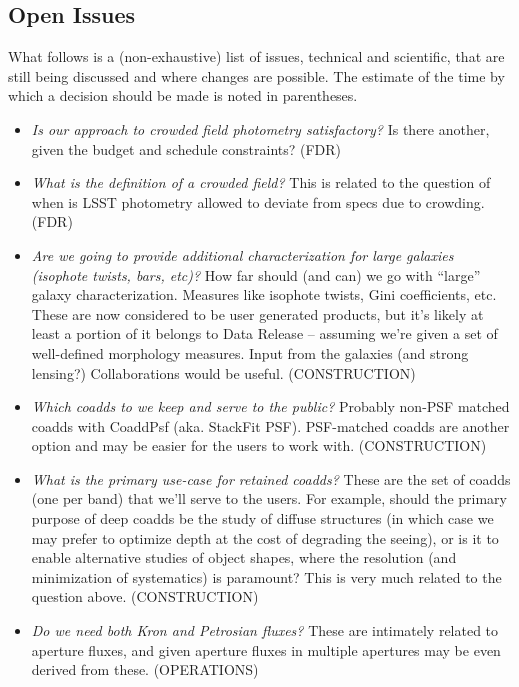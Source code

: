 \begin{openissues}
\subsection{Open Issues}

What follows is a (non-exhaustive) list of issues, technical and scientific, that are still being discussed and where changes are possible. The estimate of the time by which a decision should be made is noted in parentheses.

\begin{itemize}
    \item \emph{Is our approach to crowded field photometry satisfactory?} Is there another, given the budget and schedule constraints? (FDR)

    \item \emph{What is the definition of a crowded field?} This is related to the question of when is LSST photometry allowed to deviate from \SRD specs due to crowding. (FDR)

    \item \emph{Are we going to provide additional characterization for large galaxies (isophote twists, bars, etc)?} How far should (and can) we go with ``large'' galaxy characterization. Measures like isophote twists, Gini coefficients, etc. These are now considered to be  user generated products, but it's likely at least a portion of it belongs to Data Release -- assuming we're given a set of well-defined morphology measures. Input from the galaxies (and strong lensing?) Collaborations would be useful. (CONSTRUCTION)

    \item \emph{Which coadds to we keep and serve to the public?} Probably non-PSF matched coadds with CoaddPsf (aka. StackFit PSF). PSF-matched coadds are another option and may be easier for the users to work with. (CONSTRUCTION)

    \item \emph{What is the primary use-case for retained coadds?} These are the set of coadds (one per band) that we'll serve to the users. For example, should the primary purpose of deep coadds be the study of diffuse structures (in which case we may prefer to optimize depth at the cost of degrading the seeing), or is it to enable alternative studies of object shapes, where the resolution (and minimization of systematics) is paramount? This is very much related to the question above. (CONSTRUCTION)

    \item \emph{Do we need both Kron and Petrosian fluxes?} These are intimately related to aperture fluxes, and given aperture fluxes in multiple apertures may be even derived from these. (OPERATIONS)


\end{itemize}
\end{openissues}
